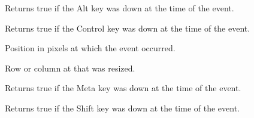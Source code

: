 
Returns true if the Alt key was down at the time of the event.

\label{wxgridsizeeventcontroldown}


Returns true if the Control key was down at the time of the event.

\label{wxgridsizeeventgetposition}


Position in pixels at which the event occurred.

\label{wxgridsizeeventgetroworcol}


Row or column at that was resized.

\label{wxgridsizeeventmetadown}


Returns true if the Meta key was down at the time of the event.

\label{wxgridsizeeventshiftdown}


Returns true if the Shift key was down at the time of the event.

